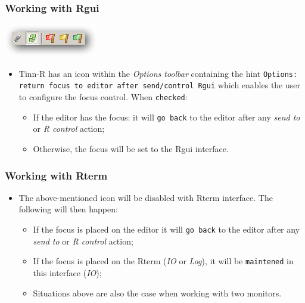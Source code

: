 

\subsubsection{Working with Rgui}

\includegraphics[scale=0.50]{./res/focus.png}

\begin{itemize}
  \item Tinn-R has an icon within the \textit{Options toolbar}
    containing the hint \texttt{Options: return focus to editor
      after send/control Rgui} which enables the user to configure
    the focus control. When \texttt{checked}:
    \begin{itemize}
      \item If the editor has the focus: it will \texttt{go back}
        to the editor after any \textit{send to} or \textit{R control}
        action;
      \item Otherwise, the focus will be set to the Rgui interface.
    \end{itemize}
\end{itemize}


\subsubsection{Working with Rterm}

\begin{itemize}
  \item The above-mentioned icon will be disabled with Rterm interface.
    The following will then happen:
    \begin{itemize}
      \item If the focus is placed on the editor it will \texttt{go back}
        to the editor after any \textit{send to} or \textit{R control} action;
      \item If the focus is placed on the Rterm (\textit{IO} or \textit{Log}),
        it will be \texttt{maintened} in this interface (\textit{IO});
      \item Situations above are also the case when working with two monitors.
    \end{itemize}
\end{itemize}


